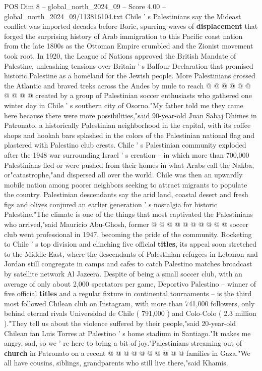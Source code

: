 \begin{textsample}{POS Dim 8 – global\_north\_2024\_09 – Score 4.00 – global\_north\_2024\_09/113816104.txt}
Chile ' s Palestinians say the Mideast conflict was imported decades before Boric, spurring waves of \textbf{displacement} that forged the surprising history of Arab immigration to this Pacific coast nation from the late 1800s as the Ottoman Empire crumbled and the Zionist movement took root.
In 1920, the League of Nations approved the British Mandate of Palestine, unleashing tensions over Britain ' s Balfour Declaration that promised historic Palestine as a homeland for the Jewish people.
More Palestinians crossed the Atlantic and braved treks across the Andes by mule to reach @ @ @ @ @ @ @ @ @ @ created by a group of Palestinian soccer enthusiasts who gathered one winter day in Chile ' s southern city of Osorno."My father told me they came here because there were more possibilities,"said 90-year-old Juan Sabaj Dhimes in Patronato, a historically Palestinian neighborhood in the capital, with its coffee shops and hookah bars splashed in the colors of the Palestinian national flag and plastered with Palestino club crests.
Chile ' s Palestinian community exploded after the 1948 war surrounding Israel ' s creation -- in which more than 700,000 Palestinians fled or were pushed from their homes in what Arabs call the Nakba, or"catastrophe,"and dispersed all over the world.
Chile was then an upwardly mobile nation among poorer neighbors seeking to attract migrants to populate the country.
Palestinian descendants say the arid land, coastal desert and fresh figs and olives conjured an earlier generation ' s nostalgia for historic Palestine."The climate is one of the things that most captivated the Palestinians who arrived,"said Mauricio Abu-Ghosh, former @ @ @ @ @ @ @ @ @ @ soccer club went professional in 1947, becoming the pride of the community.
Rocketing to Chile ' s top division and clinching five official \textbf{titles}, its appeal soon stretched to the Middle East, where the descendants of Palestinian refugees in Lebanon and Jordan still congregate in camps and cafes to catch Palestino matches broadcast by satellite network Al Jazeera.
Despite of being a small soccer club, with an average of only about 2,000 spectators per game, Deportivo Palestino -- winner of five official \textbf{titles} and a regular fixture in continental tournaments -- is the third most followed Chilean club on Instagram, with more than 741,000 followers, only behind eternal rivals Universidad de Chile ( 791,000 ) and Colo-Colo ( 2.3 million )."They tell us about the violence suffered by their people,"said 20-year-old Chilean fan Luis Torres at Palestino ' s home stadium in Santiago."It makes me angry, sad, so we ' re here to bring a bit of joy."Palestinians streaming out of \textbf{church} in Patronato on a recent @ @ @ @ @ @ @ @ @ @ families in Gaza."We all have cousins, siblings, grandparents who still live there,"said Khamis.

\end{textsample}
